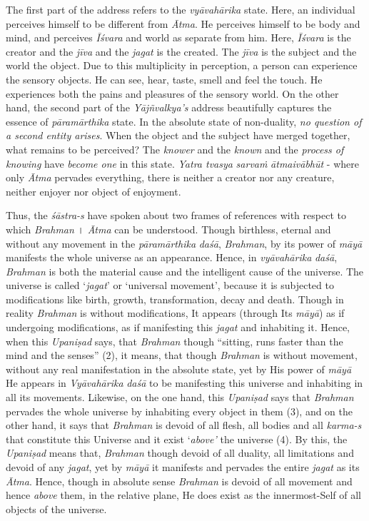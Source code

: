 The first part of the address refers to the \emph{vyāvahārika} state. Here, an individual perceives himself to be different from \emph{Ātma}. He perceives himself to be body and mind, and perceives \emph{Īśvara} and world as separate from him. Here, \emph{Īśvara} is the creator and the \emph{jīva} and the \emph{jagat} is the created. The \emph{jīva} is the subject and the world the object. Due to this multiplicity in perception, a person can experience the sensory objects. He can see, hear, taste, smell and feel the touch. He experiences both the pains and pleasures of the sensory world. On the other hand, the second part of the \emph{Yājñvalkya's} address beautifully captures the essence of \emph{pāramārthika} state. In the absolute state of non-duality, \emph{no question of a second entity arises}. When the object and the subject have merged together, what remains to be perceived? The \emph{knower} and the \emph{known} and the \emph{process of knowing} have \emph{become one} in this state. \emph{Yatra tvasya} \emph{sarvaṁ} \emph{ātmaivābhūt} - where only \emph{Ātma} pervades everything, there is neither a creator nor any creature, neither enjoyer nor object of enjoyment.

Thus, the \emph{śāstra-s} have spoken about two frames of references with respect to which \emph{Brahman} । \emph{Ātma} can be understood. Though birthless, eternal and without any movement in the \emph{pāramārthika} \emph{daśā}, \emph{Brahman}, by its power of \emph{māyā} manifests the whole universe as an appearance. Hence, in \emph{vyāvahārika} \emph{daśā}, \emph{Brahman} is both the material cause and the intelligent cause of the universe. The universe is called `\emph{jagat}' or `universal movement', because it is subjected to modifications like birth, growth, transformation, decay and death. Though in reality \emph{Brahman} is without modifications, It appears (through Its \emph{māyā}) as if undergoing modifications, as if manifesting this \emph{jagat} and inhabiting it. Hence, when this \emph{Upaniṣad} says, that \emph{Brahman} though ``sitting, runs faster than the mind and the senses'' (2), it means, that though \emph{Brahman} is without movement, without any real manifestation in the absolute state, yet by His power of \emph{māyā} He appears in \emph{Vyāvahārika} \emph{daśā} to be manifesting this universe and inhabiting in all its movements. Likewise, on the one hand, this \emph{Upaniṣad} says that \emph{Brahman} pervades the whole universe by inhabiting every object in them (3), and on the other hand, it says that \emph{Brahman} is devoid of all flesh, all bodies and all \emph{karma-s} that constitute this Universe and it exist `\emph{above'} the universe (4). By this, the \emph{Upaniṣad} means that, \emph{Brahman} though devoid of all duality, all limitations and devoid of any \emph{jagat}, yet by \emph{māyā} it manifests and pervades the entire \emph{jagat} as its \emph{Ātma}. Hence, though in absolute sense \emph{Brahman} is devoid of all movement and hence \emph{above} them, in the relative plane, He does exist as the innermost-Self of all objects of the universe.


